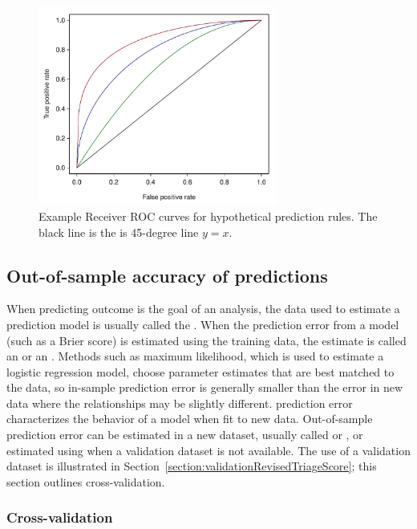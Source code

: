 \begin{figure}[!tbh]
  \centering
  \includegraphics[width=0.70\textwidth]
  {ch_logistic_regression_oi_biostat/figures/ROCExamples/ROCExamples.pdf}
    \caption{Example Receiver ROC curves for hypothetical prediction rules. The black line is the is 45-degree line $y = x$.}
    \label{figure:ROCHuBMISex}
\end{figure}

\subsection{Out-of-sample accuracy of predictions}
\label{section:predictionAccuracy} 

When predicting outcome is the goal of an analysis, the data used to estimate a prediction model is usually called the . When the prediction error from a model (such as a Brier score) is estimated using the training data, the estimate is called an  or an . Methods such as maximum likelihood, which is used to estimate a logistic regression model, choose parameter estimates that are best matched to the data, so in-sample prediction error is generally smaller than the error in new data where the relationships may be slightly different.   prediction error characterizes the behavior of a model when fit to new data.  Out-of-sample prediction error can be estimated in a new dataset, usually called  or , or estimated using  when a validation dataset is not available.  The use of a validation dataset is illustrated in Section~\ref{section:validationRevisedTriageScore}; this section outlines cross-validation. 

\subsubsection{Cross-validation}

